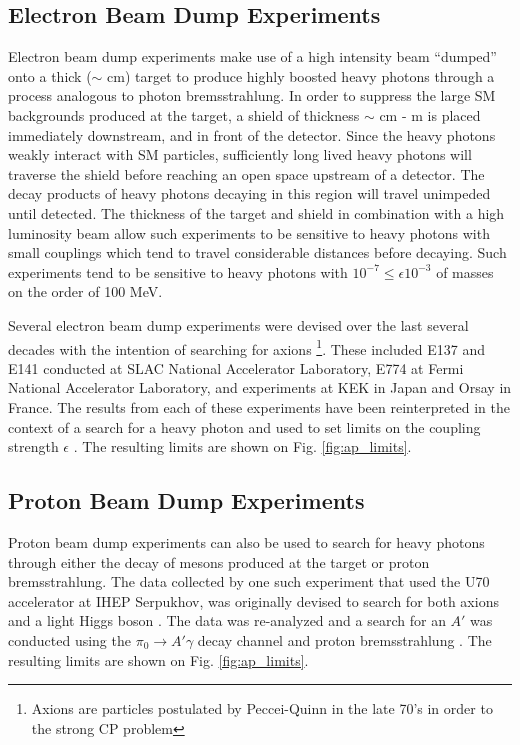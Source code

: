 \subsection{Electron Beam Dump Experiments}

Electron beam dump experiments make use of a high intensity beam ``dumped'' onto
a thick ($\sim$ cm) target to produce highly boosted heavy photons through a 
process analogous to photon bremsstrahlung.  In order to suppress the large
SM backgrounds produced at the target, a shield of thickness $\sim$ cm - m
is placed immediately downstream, and in front of the detector.  Since the 
heavy photons weakly interact with SM particles, sufficiently long lived 
heavy photons will traverse the shield before reaching an open space upstream
of a detector.  The decay products of heavy photons decaying in this region 
will travel unimpeded until detected.
The thickness of the target and shield in combination with a high luminosity
beam allow such experiments to be sensitive to heavy photons with small 
couplings which tend to travel considerable distances before decaying. Such 
experiments tend to be sensitive to heavy photons with 
$10^{-7} \le \epsilon 10^{-3}$  of masses on the order of 100 MeV. 


Several electron beam dump experiments were devised over the last several decades with
the intention of searching for axions \footnote{Axions are particles postulated 
by Peccei-Quinn in the late 70's in order to the strong CP problem}.  These 
included E137 \cite{Bjorken:1988as}
and E141 \cite{riordan1987} conducted at SLAC National Accelerator Laboratory,
E774 \cite{bross1991} at Fermi National Accelerator Laboratory, and experiments at 
KEK \cite{konaka1986} in Japan and Orsay \cite{davier1989} in France. 
The results from each of these experiments have been reinterpreted in the 
context of a search for a heavy photon and used to set limits on the coupling
strength $\epsilon$ \cite{Bjorken:2009mm, andreas2012}.  The resulting limits are 
shown on Fig. \ref{fig:ap_limits}.

\subsection{Proton Beam Dump Experiments}

Proton beam dump experiments can also be used to search for heavy photons
through either the decay of mesons produced at the target or proton
bremsstrahlung.  The data collected by one such experiment that used the U70
accelerator at IHEP Serpukhov, was originally devised to search for both axions
and a light Higgs boson \cite{Blumlein:1990ay, Blumlein:1991xh}.  The data was 
re-analyzed and a search for an $A'$ was conducted
using the $\pi_0 \rightarrow A'\gamma$ decay channel and proton bremsstrahlung
\cite{johannes2011, johannes2014}. The resulting limits are shown on Fig. 
\ref{fig:ap_limits}.

